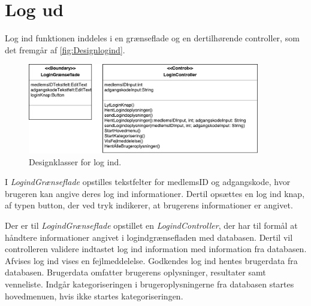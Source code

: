 \section{Log ud}

Log ind funktionen inddeles i en grænseflade og en dertilhørende controller, som det fremgår af \autoref{fig:Designlogind}. 

\begin{figure} [H]
\centering
\includegraphics[width=0.9\textwidth]{figures/MVC/MVCLogInd}
\caption{Designklasser for log ind.}
\label{fig:Designlogind}
\end{figure}

I \textit{LogindGrænseflade} opstilles tekstfelter for medlemsID og adgangskode, hvor brugeren kan angive deres log ind informationer. Dertil opsættes en log ind knap, af typen button, der ved tryk indikerer, at brugerens informationer er angivet. 

Der er til \textit{LogindGrænseflade} opstillet en \textit{LogindController}, der har til formål at håndtere informationer angivet i logindgrænsefladen med databasen. Dertil vil controlleren validere indtastet log ind information med information fra databasen. Afvises log ind vises en fejlmeddelelse. Godkendes log ind hentes brugerdata fra databasen. Brugerdata omfatter brugerens oplysninger, resultater samt venneliste. Indgår kategoriseringen i brugeroplysningerne fra databasen startes hovedmenuen, hvis ikke startes kategoriseringen. 
